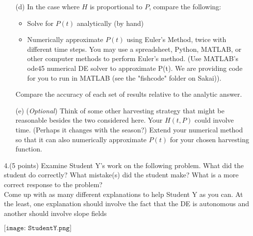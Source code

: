 \documentclass[12pt,letterpaper]{hmcpset}
\begin{document}
\begin{problem}
\begin{enumerate}
    \item[(d)] In the case where $H$ is proportional to $P$, compare the following:
    
\begin{itemize}
  \item Solve for $P(t)$ analytically (by hand)
  \item Numerically approximate $P(t)$ using Euler’s Method, twice with different time
steps. You may use a spreadsheet, Python, MATLAB, or other computer methods
to perform Euler’s method. (Use MATLAB’s ode45 numerical DE solver to
approximate P(t). We are providing code for you to run in MATLAB (see the
"fishcode" folder on Sakai)).
\end{itemize}  
    
Compare the accuracy of each set of results relative to the analytic answer.
    \item[(e)] (\textit{Optional}) Think of some other harvesting strategy that might be reasonable besides
the two considered here. Your $H(t, P)$ could involve time. (Perhaps it changes with the
season?) Extend your numerical method so that it can also numerically approximate
$P(t)$ for your chosen harvesting function.
\end{enumerate}
\end{problem}
\newpage

\begin{problem}
4.(5 points) Examine Student Y's work on the following problem. What did the student do
correctly? What mistake(s) did the student make? What is a more correct response to the
problem?\\
Come up with as many different explanations to help Student Y as you can. At the least, one
explanation should involve the fact that the DE is autonomous and another should involve
slope fields

\begin{center}
    
$\texttt{[image: StudentY.png]}$
\end{center}
\end{problem}
\newpage
\end{document}
